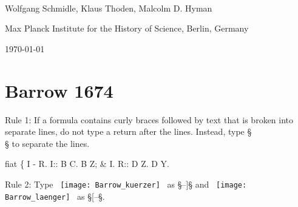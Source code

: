 \documentclass[fontsize=11pt, paper=a4, 
DIV15,
normalheadings,
parskip=half-, 
pointlessnumbers]{scrartcl}
\begin{document}
\begin{center}
{} \\[5mm]
\large Wolfgang Schmidle, Klaus Thoden, Malcolm D. Hyman

\normalsize Max Planck Institute for the History of Science, Berlin, Germany

\today
\end{center}

\section{Barrow 1674}

\begin{mainrule}
Rule 1: If a formula contains curly braces followed by text that is broken into separate lines, do not type a return after the lines. Instead, type §\\§ to separate the lines.
\end{mainrule}

\begin{example}[1: \, Barrow p. 115]

\vspace{-5mm}
\begin{typeLatin}
fiat \{ I - R. I:: B C. B Z; \& \bold{\bs\bs} I. R:: D Z. D Y.
\end{typeLatin}

\end{example}

\begin{example}[2: \, Barrow p. 120]

\vspace{-5mm}

\end{example}

\begin{mainrule}
Rule 2: Type \, \texttt{[image: Barrow\_kuerzer]} \, as §--]§ and \, \texttt{[image: Barrow\_laenger]} \, as §[--§.
\end{mainrule}
\end{document}
